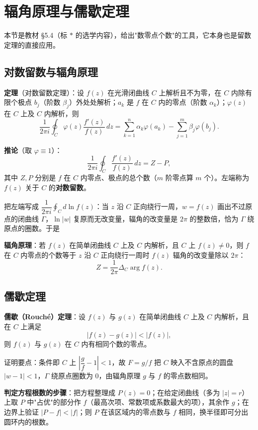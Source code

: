 \section{辐角原理与儒歇定理}

本节是教材 \S5.4（标 \(*\) 的选学内容），给出"数零点个数"的工具，它本身也是留数定理的直接应用。

\subsection{对数留数与辐角原理}

\textbf{定理}（对数留数定理）：设 \(f(z)\) 在光滑闭曲线 \(C\) 上解析且不为零，在 \(C\) 内除有限个极点 \(b_j\)（阶数 \(\beta_j\)）外处处解析；\(a_k\) 是 \(f\) 在 \(C\) 内的零点（阶数 \(\alpha_k\)）；\(\varphi(z)\) 在 \(C\) 上及 \(C\) 内解析，则
\[
\frac{1}{2\pi i}\oint_C\varphi(z)\frac{f'(z)}{f(z)}\,dz
=\sum_{k=1}^{n}\alpha_k\varphi(a_k)-\sum_{j=1}^{m}\beta_j\varphi(b_j).
\]

\textbf{推论}（取 \(\varphi\equiv1\)）：
\[
\frac{1}{2\pi i}\oint_C\frac{f'(z)}{f(z)}\,dz=Z-P,
\]
其中 \(Z,P\) 分别是 \(f\) 在 \(C\) 内零点、极点的总个数（\(m\) 阶零点算 \(m\) 个）。左端称为 \(f(z)\) 关于 \(C\) 的\textbf{对数留数}。

把左端写成 \(\dfrac{1}{2\pi i}\oint_C d\ln f(z)\)：当 \(z\) 沿 \(C\) 正向绕行一周，\(w=f(z)\) 画出不过原点的闭曲线 \(\Gamma\)，\(\ln|w|\) 复原而无改变量，辐角的改变量是 \(2\pi\) 的整数倍，恰为 \(\Gamma\) 绕原点的圈数。于是

\textbf{辐角原理}：若 \(f(z)\) 在简单闭曲线 \(C\) 上及 \(C\) 内解析，且 \(C\) 上 \(f(z)\neq0\)，则 \(f\) 在 \(C\) 内零点的个数等于 \(z\) 沿 \(C\) 正向绕行一周时 \(f(z)\) 辐角的改变量除以 \(2\pi\)：
\[
Z=\frac{1}{2\pi}\Delta_C\arg f(z).
\]

\subsection{儒歇定理}

\textbf{儒歇（Rouch\'e）定理}：设 \(f(z)\) 与 \(g(z)\) 在简单闭曲线 \(C\) 上及 \(C\) 内解析，且在 \(C\) 上满足
\[
|f(z)-g(z)|<|f(z)|,
\]
则 \(f(z)\) 与 \(g(z)\) 在 \(C\) 内有相同个数的零点。

证明要点：条件即 \(C\) 上 \(\left|\dfrac{g}{f}-1\right|<1\)，故 \(F=g/f\) 把 \(C\) 映入不含原点的圆盘 \(|w-1|<1\)，\(\Gamma\) 绕原点圈数为 \(0\)，由辐角原理 \(g\) 与 \(f\) 的零点数相同。

\textbf{判定方程根数的步骤}：把方程整理成 \(P(z)=0\)；在给定闭曲线（多为 \(|z|=r\)）上取 \(P\) 中"占优"的部分作 \(f\)（最高次项、常数项或系数最大的项），其余作 \(g\)；在边界上验证 \(|P-f|<|f|\)；则 \(P\) 在该区域内的零点数与 \(f\) 相同，换半径即可分出圆环内的根数。

